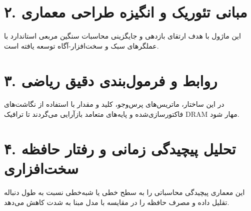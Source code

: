 \documentclass[12pt,a4paper]{article}
\begin{document}
\section*{۲. مبانی تئوریک و انگیزه طراحی معماری}
این ماژول با هدف ارتقای بازدهی و جایگزینی محاسبات سنگین مربعی استاندارد با عملگرهای سبک و سخت‌افزار-آگاه توسعه یافته است.

\section*{۳. روابط و فرمول‌بندی دقیق ریاضی}
در این ساختار، ماتریس‌های پرس‌وجو، کلید و مقدار با استفاده از نگاشت‌های فاکتورسازی‌شده و پایه‌های متعامد بازآرایی می‌گردند تا ترافیک DRAM مهار شود.

\section*{۴. تحلیل پیچیدگی زمانی و رفتار حافظه سخت‌افزاری}
این معماری پیچیدگی محاسباتی را به سطح خطی یا شبه‌خطی نسبت به طول دنباله تقلیل داده و مصرف حافظه را در مقایسه با مدل مبنا به شدت کاهش می‌دهد.
\end{document}
